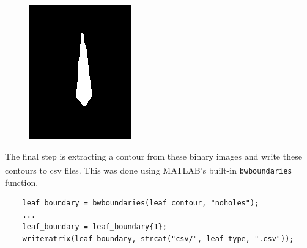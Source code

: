 \documentclass[12pt,english]{article}
\begin{document}
\begin{figure}[!hbt]
\begin{centre}
\begin{minipage}{0.32\textwidth}
		\includegraphics[width=\textwidth]{../code/contour/contour_mask/subulate}
	\end{minipage}
\end{centre}
\end{figure}

The final step is extracting a contour from these binary images
and write these contours to csv files.
This was done using MATLAB\textsuperscript{\textregistered}'s
built-in \verb|bwboundaries| function.
\begin{verbatim}
    leaf_boundary = bwboundaries(leaf_contour, "noholes");
    ...
    leaf_boundary = leaf_boundary{1};
    writematrix(leaf_boundary, strcat("csv/", leaf_type, ".csv"));
\end{verbatim}
\end{document}
